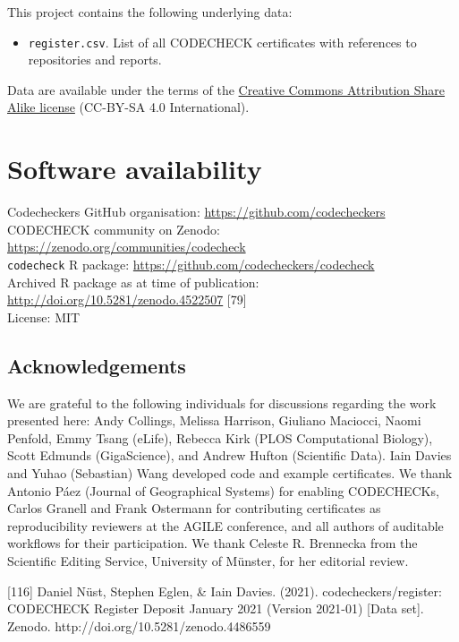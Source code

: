 \documentclass[12pt]{article}
\begin{document}
This project contains the following underlying data:

\begin{itemize}
  \item \texttt{register.csv}. List of all CODECHECK certificates with references to repositories and reports.
\end{itemize}

Data are available under the terms of the \href{https://creativecommons.org/licenses/by-sa/4.0/legalcode}{Creative Commons Attribution Share Alike license} (CC-BY-SA 4.0 International).

\section*{Software availability}
Codecheckers GitHub organisation: \url{https://github.com/codecheckers}\\
CODECHECK community on Zenodo: \url{https://zenodo.org/communities/codecheck}\\

\texttt{codecheck} R package: \url{https://github.com/codecheckers/codecheck}\\
Archived R package as at time of publication: \url{http://doi.org/10.5281/zenodo.4522507} [79]\\
License: MIT

\subsection*{Acknowledgements}\label{acknowledgements}
We are grateful to the following individuals for discussions regarding
the work presented here: Andy Collings, Melissa Harrison, Giuliano
Maciocci, Naomi Penfold, Emmy Tsang (eLife), Rebecca Kirk (PLOS
Computational Biology), Scott Edmunds (GigaScience), and Andrew Hufton
(Scientific Data). Iain Davies and Yuhao (Sebastian) Wang developed
code and example certificates.  We thank Antonio P\'{a}ez (Journal of
Geographical Systems) for enabling CODECHECKs, Carlos Granell and
Frank Ostermann for contributing certificates as reproducibility
reviewers at the AGILE conference, and all authors of auditable
workflows for their participation.  We thank Celeste R. Brennecka from
the Scientific Editing Service, University of M\"unster, for her
editorial review.



{\small
}
[116] Daniel Nüst, Stephen Eglen, \& Iain Davies. (2021). codecheckers/register: CODECHECK Register Deposit January 2021 (Version 2021-01) [Data set]. Zenodo. http://doi.org/10.5281/zenodo.4486559
\end{document}
